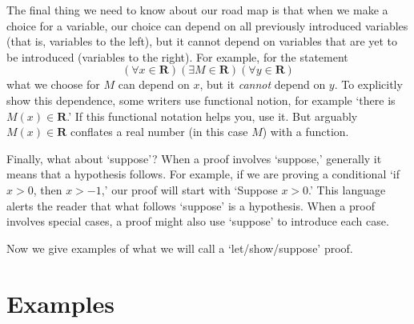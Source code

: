 \documentclass[12pt,fleqn]{article}
\newcommand{\reals}{\mathbf{R}}
\newcounter{ex}\setcounter{ex}{0}
\begin{document}
The final thing we need to know about our road map is that when we 
make a choice for a variable, our choice can depend on all previously
introduced variables (that is, variables to the left), but it cannot 
depend on variables that are yet to be introduced (variables to the right). 
For example, 
for the statement
\begin{equation*}
   \left(\forall x \in \reals\right)
   \left(\exists M \in \reals\right)
   \left(\forall y \in \reals \right)
 \end{equation*}
 what we choose for $M$ can depend on $x$, but it \emph{cannot}  depend on $y$. To explicitly show this dependence, some writers
 use functional notion, for example `there is $M(x) \in \reals$.'  If this functional notation helps you, use it. But arguably  
 $M(x) \in \reals$ conflates a real number (in this case $M$) with a function.

Finally, what about `suppose'?  When a proof involves `suppose,' generally it means that a hypothesis follows. For example, if
we are proving a conditional `if $x > 0$, then $x > -1$,' our proof will start with `Suppose $x > 0$.' This language alerts the
reader that what follows `suppose' is a hypothesis.  When a proof involves special cases, a proof might also use `suppose' to 
introduce each case.

Now we give examples of what we will call a `let/show/suppose' proof.

\section{Examples}
            
\end{document}
